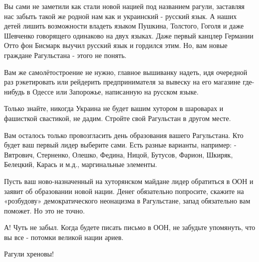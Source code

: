 Вы сами не заметили как стали новой нацией  под названием рагули, заставляя нас
забыть такой же родной нам как и украинский -  русский язык. А наших детей
лишить возможности владеть языком Пушкина, Толстого, Гоголя и даже Шевченко
говорящего одинаково на двух языках. Даже первый канцлер Германии Отто фон
Бисмарк выучил русский язык и гордился этим. Но, вам новые граждане Рагульстана
- этого не понять.

Вам же самолётостроение не нужно, главное вышиванку надеть, идя очередной раз
рэкетировать или рейдерить  предпринимателя за вывеску на его магазине
где-нибудь в Одессе или Запорожье, написанную на русском языке. 

Только знайте, никогда  Украина не будет вашим хутором в шароварах и
фашисткой свастикой, не дадим.  Стройте свой Рагульстан в другом месте. 

Вам осталось только провозгласить день образования вашего Рагульстана. Кто
будет ваш первый лидер выберите сами. Есть разные варианты, например: -
Вятрович, Стерненко, Олешко, Федина, Ницой, Бутусов, Фарион, Шкиряк, Белецкий,
Карась и м.д., маргинальные элементы.

Пусть ваш ново-назначенный на хуторянском майдане лидер обратиться в ООН и
заявит об образовании новой нации. Денег обязательно попросите,  скажите на
«розбудову» демократического неонацизма в Рагульстане, запад обязательно вам
поможет. Но это не точно. 

А! Чуть не забыл. Когда будете писать письмо в ООН,  не забудьте упомянуть, что
вы все - потомки великой нации ариев. 

Рагули хреновы!

